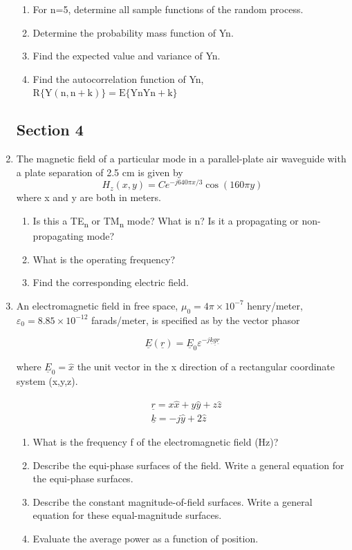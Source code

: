 \documentclass[main.tex]{subfiles}
\begin{document}
\begin{enumerate}
    \begin{enumerate}
        \item For n=5, determine all sample functions of the random process.
        \item Determine the probability mass function of Yn.
        \item Find the expected value and variance of Yn.
        \item Find the autocorrelation function of Yn, $\mathrm{R}\{\mathrm{Y}(\mathrm{n}, \mathrm{n}+\mathrm{k})\}=\mathrm{E}\{\mathrm{Yn} \mathrm{Yn}+\mathrm{k}\}$
    \end{enumerate}
    
\subsection{Section 4}

\item The magnetic field of a particular mode in a parallel-plate air waveguide with a plate separation of 2.5 cm is given by
$$H_{z}(x, y)=C e^{-j 640 \pi x / 3} \cos (160 \pi y)$$
where x and y are both in meters.
    
    \begin{enumerate}
        \item Is this a TE\textsubscript{n} or TM\textsubscript{n} mode? What is n? Is it a propagating or non-propagating mode?
        \item What is the operating frequency?
        \item Find the corresponding electric field.
    \end{enumerate}
    
\item An electromagnetic field in free space, $\mu_{0}=4 \pi \times 10^{-7}$ henry/meter, $\varepsilon_0 = 8.85 \times 10^{-12}$ farads/meter, is specified as by the vector phasor 

$$\underline{E}(\underline{r})=\underline{E}_{0} \varepsilon^{-j \underline{k} \underline{g} \underline{r}}$$

where $\underline{E}_{0}=\hat{x}$ the unit vector in the x direction of a rectangular coordinate system (x,y,z).

$$\begin{aligned}
&\underline{r}=x \hat{x}+y \hat{y}+z \hat{z} \\
&\underline{k}=-j \hat{y}+2 \hat{z}
\end{aligned}$$

    \begin{enumerate}
        \item What is the frequency f of the electromagnetic field (Hz)?
        \item Describe the equi-phase surfaces of the field. Write a general equation for the equi-phase surfaces.
        \item Describe the constant magnitude-of-field surfaces. Write a general equation for these equal-magnitude surfaces.
        \item Evaluate the average power as a function of position.
    \end{enumerate}


\end{enumerate}
\end{document}
